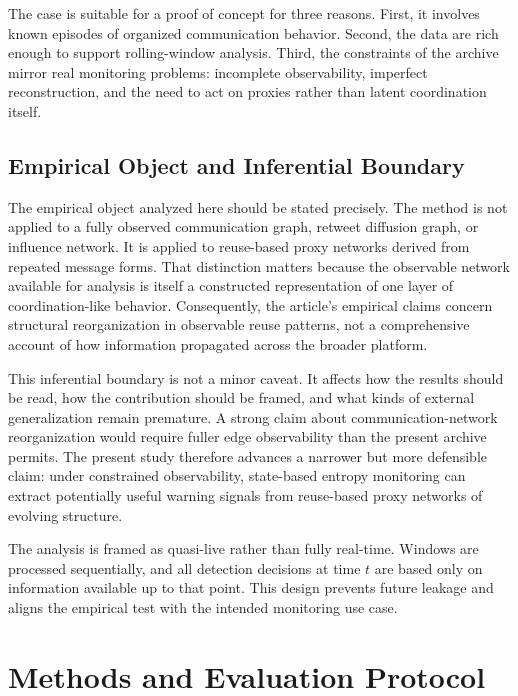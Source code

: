 \documentclass[sigconf]{acmart}
\begin{document}
The case is suitable for a proof of concept for three reasons. First, it involves known episodes of organized communication behavior. Second, the data are rich enough to support rolling-window analysis. Third, the constraints of the archive mirror real monitoring problems: incomplete observability, imperfect reconstruction, and the need to act on proxies rather than latent coordination itself.

\subsection{Empirical Object and Inferential Boundary}

The empirical object analyzed here should be stated precisely. The method is not applied to a fully observed communication graph, retweet diffusion graph, or influence network. It is applied to reuse-based proxy networks derived from repeated message forms. That distinction matters because the observable network available for analysis is itself a constructed representation of one layer of coordination-like behavior. Consequently, the article's empirical claims concern structural reorganization in observable reuse patterns, not a comprehensive account of how information propagated across the broader platform.

This inferential boundary is not a minor caveat. It affects how the results should be read, how the contribution should be framed, and what kinds of external generalization remain premature. A strong claim about communication-network reorganization would require fuller edge observability than the present archive permits. The present study therefore advances a narrower but more defensible claim: under constrained observability, state-based entropy monitoring can extract potentially useful warning signals from reuse-based proxy networks of evolving structure.

The analysis is framed as quasi-live rather than fully real-time. Windows are processed sequentially, and all detection decisions at time $t$ are based only on information available up to that point. This design prevents future leakage and aligns the empirical test with the intended monitoring use case.

\section{Methods and Evaluation Protocol}
\label{sec:methods}
\end{document}
